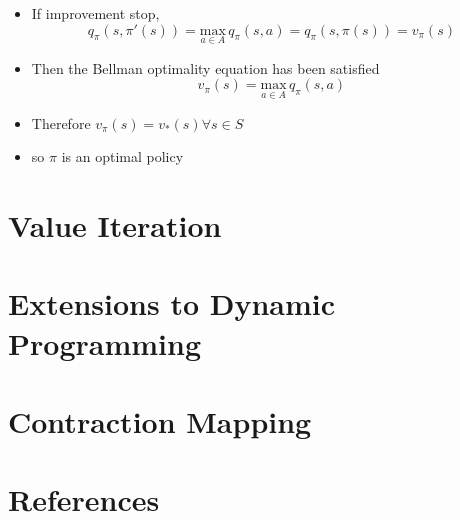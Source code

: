 \documentclass[varwidth]{article}
\begin{document}
\begin{itemize}
    \item If improvement stop,
    $$ q_\pi(s,\pi'(s)) =  \underset{a \in A}{\mathrm{max}}\, q_\pi(s,a) = q_\pi(s, \pi(s)) = v_\pi(s) $$
    \item Then the Bellman optimality equation has been satisfied
    $$ v_\pi(s) = \underset{a \in A}{\mathrm{max}}\, q_\pi(s,a) $$
    \item Therefore $v_\pi(s)  = v_*(s) \forall s \in S$
    \item so $\pi$ is an optimal policy
\end{itemize}



\section{Value Iteration}
\section{Extensions to Dynamic Programming}
\section{Contraction Mapping}

\section{References}
\end{document}
